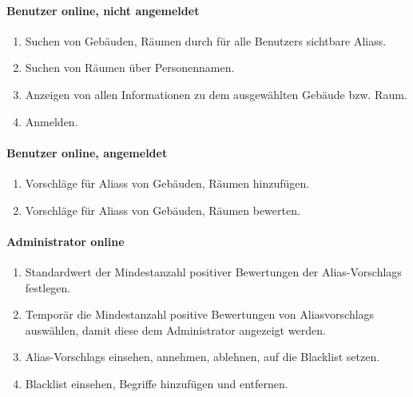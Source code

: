 \paragraph{\Gls{Benutzer} online, nicht angemeldet}
\begin{enumerate}[label=\textbf{/T\arabic*0/}, align=left]
	\item Suchen von Gebäuden, Räumen durch für alle \Glspl{Benutzer} sichtbare \Glspl{Alias}.
	\item Suchen von Räumen über Personennamen.
	\item Anzeigen von allen Informationen zu dem ausgewählten Gebäude bzw. Raum.
	\item Anmelden.
\end{enumerate}

\paragraph{\Gls{Benutzer} online, angemeldet}
\begin{enumerate}[label=\textbf{/T\arabic*0/}, align=left]
	\item Vorschläge für \Glspl{Alias} von Gebäuden, Räumen hinzufügen.
	\item Vorschläge für \Glspl{Alias} von Gebäuden, Räumen bewerten.
\end{enumerate}

\paragraph{\Gls{Administrator} online}
\begin{enumerate}[label=\textbf{/T\arabic*0/}, align=left]
	\item Standardwert der Mindestanzahl positiver Bewertungen der \Glspl{Alias-Vorschlag} festlegen.
	\item Temporär die Mindestanzahl positive Bewertungen von \Glspl{Aliasvorschlag} auswählen, damit diese dem \Gls{Administrator} angezeigt werden.
	\item \Glspl{Alias-Vorschlag} einsehen, annehmen, ablehnen, auf die \Gls{Blacklist} setzen.
	\item \Gls{Blacklist} einsehen, Begriffe hinzufügen und entfernen.
\end{enumerate}
